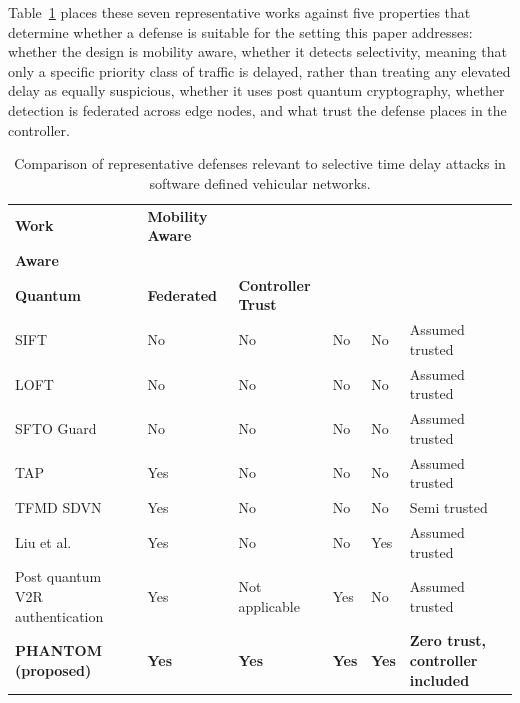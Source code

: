 \documentclass[final,5p,twocolumn]{elsarticle}
\theoremstyle{remark}
\theoremstyle{plain}
\begin{document}
Table~\ref{tab:phantom_related} places these seven representative works
against five properties that determine whether a defense is suitable for the
setting this paper addresses: whether the design is mobility aware, whether it
detects selectivity, meaning that only a specific priority class of traffic is
delayed, rather than treating any elevated delay as equally suspicious,
whether it uses post quantum cryptography, whether detection is federated
across edge nodes, and what trust the defense places in the controller.

\begin{table}[!t]
	\centering
	\caption{Comparison of representative defenses relevant to selective time delay attacks in software defined vehicular networks.}
	\label{tab:phantom_related}
	\renewcommand{\arraystretch}{1.25}
	\footnotesize
	\begin{tabular}{|>{\raggedright\arraybackslash}p{2.3cm}|>{\centering\arraybackslash}p{1.6cm}|>{\centering\arraybackslash}p{1.9cm}|>{\centering\arraybackslash}p{1.6cm}|>{\centering\arraybackslash}p{1.6cm}|>{\raggedright\arraybackslash}p{2.6cm}|}
		\hline
		\textbf{Work} & \textbf{Mobility Aware} & \makecell{\textbf{Selectivity}\\\textbf{Aware}} & \makecell{\textbf{Post}\\\textbf{Quantum}} & \textbf{Federated} & \textbf{Controller Trust} \\
		\hline
		SIFT~\cite{Pascoal2017} & No & No & No & No & Assumed trusted \\
		\hline
		LOFT~\cite{Cao2022LOFT} & No & No & No & No & Assumed trusted \\
		\hline
		SFTO Guard~\cite{Tang2023SFTOGuard} & No & No & No & No & Assumed trusted \\
		\hline
		TAP~\cite{Arsalan2018} & Yes & No & No & No & Assumed trusted \\
		\hline
		TFMD SDVN~\cite{Nayak2022} & Yes & No & No & No & Semi trusted \\
		\hline
		Liu et al.~\cite{Liu2021BFLVEC} & Yes & No & No & Yes & Assumed trusted \\
		\hline
		Post quantum V2R authentication~\cite{ElDalahmeh2025} & Yes & Not applicable & Yes & No & Assumed trusted \\
		\hline
		\textbf{PHANTOM (proposed)} & \textbf{Yes} & \textbf{Yes} & \textbf{Yes} & \textbf{Yes} & \textbf{Zero trust, controller included} \\
		\hline
	\end{tabular}
\end{table}
\end{document}
